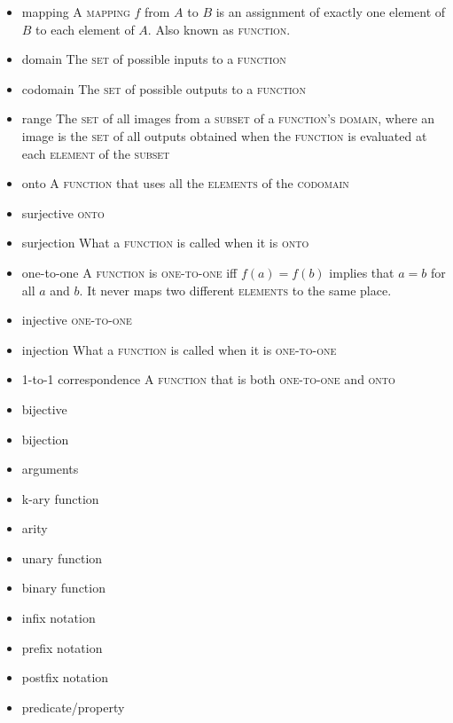 \documentclass{article}
\newcommand{\term}[1]{\textsc{#1}}
\begin{document}
\begin{itemize}
\item mapping
  \subitem A \term{mapping} $f$ from $A$ to $B$ is an assignment of exactly one element of $B$ to each element of $A$. Also known as \term{function}.

\item domain
   \subitem The \term{set} of possible inputs to a \term{function}
\item codomain
   \subitem The \term{set} of possible outputs to a \term{function}
\item range
   \subitem The \term{set} of all images from a \term{subset} of a \term{function's} \term{domain}, where an image is the \term{set} of all outputs obtained when the \term{function} is evaluated at each \term{element} of the \term{subset}
\item onto
   \subitem A \term{function} that uses all the \term{elements} of the \term{codomain}
\item surjective
   \subitem \term{onto}
\item surjection
   \subitem What a \term{function} is called when it is \term{onto}
\item one-to-one
   \subitem A \term{function} is \term{one-to-one} iff $f(a) = f(b)$ implies that $a = b$ for all $a$ and $b$. It never maps two different \term{elements} to the same place.
\item injective
   \subitem \term{one-to-one}
\item injection
   \subitem What a \term{function} is called when it is \term{one-to-one}
\end{itemize}

\bigskip \indent
\begin{itemize}
\item 1-to-1 correspondence
   \subitem A \term{function} that is both \term{one-to-one} and \term{onto}
\item bijective
 
\item bijection

\item arguments

\item k-ary function

\item arity

\item unary function

\item binary function

\item infix notation

\item prefix notation

\item postfix notation

\item predicate/property

\end{itemize}
\end{document}
